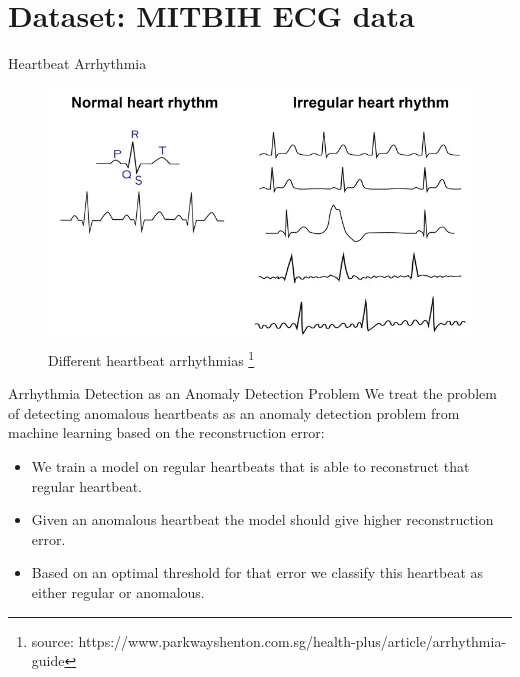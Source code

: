 \section{Dataset: MITBIH ECG data}
\begin{frame}{Heartbeat Arrhythmia}
    \begin{figure}
        \centering
        \includegraphics[scale=0.3]{images/heartbeat_arr.png}
        \caption[]{Different heartbeat arrhythmias \footnote{source: https://www.parkwayshenton.com.sg/health-plus/article/arrhythmia-guide}}
        \label{fig:enter-label}
    \end{figure}
\end{frame}

\begin{frame}{Arrhythmia Detection as an Anomaly Detection Problem}
We treat the problem of detecting anomalous heartbeats as an anomaly detection problem from machine learning based on the \alert{reconstruction error}:
\begin{itemize}
    \item<2->  We train a model \alert{on regular heartbeats} that is able to reconstruct that regular heartbeat.
    \item<3->  Given an anomalous heartbeat the model should give \alert{higher reconstruction error}.
    \item<4->  Based on an optimal \alert{threshold} for that error we classify this heartbeat as either regular or anomalous.
\end{itemize}
\end{frame} 

